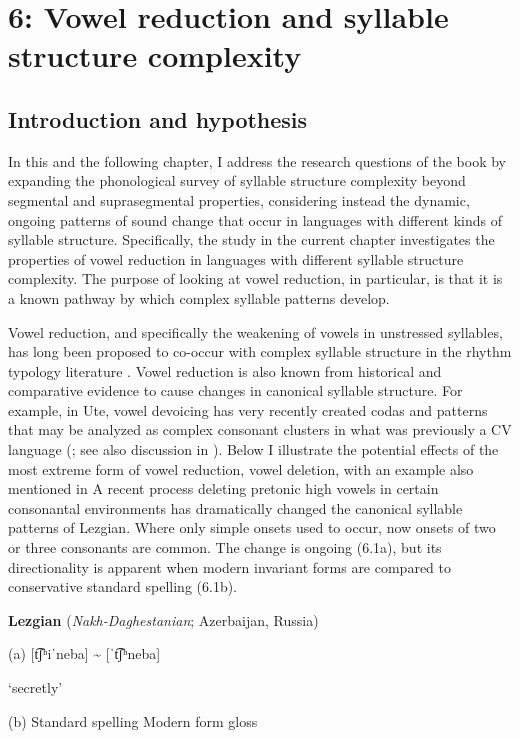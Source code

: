 \chapter{6: Vowel reduction and syllable structure complexity}
\section{Introduction and hypothesis}\label{sec:6.1}

  In this and the following chapter, I address the research questions of the book by expanding the phonological survey of syllable structure complexity beyond segmental and suprasegmental properties, considering instead the dynamic, ongoing patterns of sound change that occur in languages with different kinds of syllable structure. Specifically, the study in the current chapter investigates the properties of vowel reduction in languages with different syllable structure complexity. The purpose of looking at vowel reduction, in particular, is that it is a known pathway by which complex syllable patterns develop.

  Vowel reduction, and specifically the weakening of vowels in unstressed syllables, has long been proposed to co-occur with complex syllable structure in the rhythm typology literature \citep{Auer1993}. Vowel reduction is also known from historical and comparative evidence to cause changes in canonical syllable structure. For example, in Ute, vowel devoicing has very recently created codas and patterns that may be analyzed as complex consonant clusters in what was previously a CV language (\citealt{Givón2011}; see also discussion in ). Below I illustrate the potential effects of the most extreme form of vowel reduction, vowel deletion, with an example also mentioned in  A recent process deleting pretonic high vowels in certain consonantal environments has dramatically changed the canonical syllable patterns of Lezgian. Where only simple onsets used to occur, now onsets of two or three consonants are common. The change is ongoing (6.1a), but its directionality is apparent when modern invariant forms are compared to conservative standard spelling (6.1b).

\ea\label{ex:(6.1)}
  \textbf{Lezgian} (\textit{Nakh-Daghestanian}; Azerbaijan, Russia)

(a)  [t͡ʃʰiˈneba] {\textasciitilde} [ˈt͡ʃʰneba]

\glt ‘secretly’

(b)  Standard spelling  Modern form    gloss

